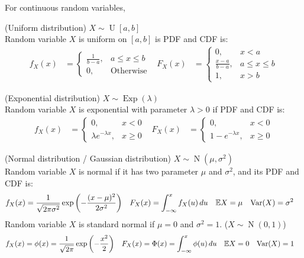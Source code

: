 \documentclass{huhtakm-template-book}
\newcommand{\expect}{\mathbb{E}}
\DeclareMathOperator{\U}{U}
\DeclareMathOperator{\Exp}{Exp}
\DeclareMathOperator{\N}{N}
\DeclareMathOperator{\Var}{Var}
\begin{document}
    \newpage
    For continuous random variables,
    \begin{seg}(Uniform distribution) $X\sim\U[a,b]$\\
        Random variable $X$ is uniform on $[a,b]$ is PDF and CDF is:
        \begin{align*}
            f_{X}(x)&=\begin{cases}
                \frac{1}{b-a}, &a\leq x\leq b\\
                0, &\text{Otherwise}
            \end{cases} & F_{X}(x)&=\begin{cases}
                0, &x<a\\
                \frac{x-a}{b-a}, &a\leq x\leq b\\
                1, &x>b
            \end{cases}
        \end{align*}    
    \end{seg}
    \begin{seg}(Exponential distribution) $X\sim\Exp(\lambda)$\\
        Random variable $X$ is exponential with parameter $\lambda>0$ if PDF and CDF is:
        \begin{align*}
            f_{X}(x)&=\begin{cases}
                0, &x<0\\
                \lambda e^{-\lambda x}, &x\geq 0
            \end{cases} & F_{X}(x)&=\begin{cases}
                0, &x<0\\
                1-e^{-\lambda x}, &x\geq 0
            \end{cases}
        \end{align*}
    \end{seg}
    \begin{seg}(Normal distribution / Gaussian distribution) $X\sim\N(\mu,\sigma^{2})$\\
        Random variable $X$ is normal if it has two parameter $\mu$ and $\sigma^{2}$, and its PDF and CDF is:
        \begin{align*}
            f_{X}(x)&=\frac{1}{\sqrt{2\pi\sigma^{2}}}\exp\left(-\frac{(x-\mu)^{2}}{2\sigma^{2}}\right) & F_{X}(x)&=\intlu{-\infty}{x}f_{X}(u)\,du & \expect X&=\mu & \Var(X)&=\sigma^{2}
        \end{align*}
        Random variable $X$ is standard normal if $\mu=0$ and $\sigma^{2}=1$. ($X\sim\N(0,1)$)
        \begin{align*}
            f_{X}(x)&=\phi(x)=\frac{1}{\sqrt{2\pi}}\exp\left(-\frac{x^{2}}{2}\right) & F_{X}(x)&=\Phi(x)=\intlu{-\infty}{x}\phi(u)\,du & \expect X&=0 & \Var(X)&=1
        \end{align*}
    \end{seg}
\end{document}
